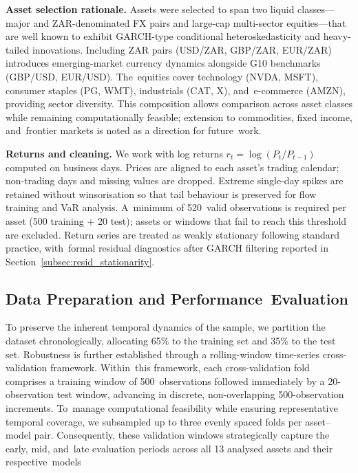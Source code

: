 \documentclass[risks,article,accept,pdftex,moreauthors]{Definitions/mdpi}
\begin{document}
\textbf{Asset selection rationale.} Assets were selected to span two liquid classes—major and ZAR-denominated FX pairs and large-cap multi-sector equities—that are well known to exhibit GARCH-type conditional heteroskedasticity and heavy-tailed innovations. Including ZAR pairs (USD/ZAR, GBP/ZAR, EUR/ZAR) introduces emerging-market currency dynamics alongside G10 benchmarks (GBP/USD, EUR/USD). The~equities cover technology (NVDA, MSFT), consumer staples (PG, WMT), industrials (CAT, X), and~e-commerce (AMZN), providing sector diversity. This composition allows comparison across asset classes while remaining computationally feasible; extension to commodities, fixed income, and~frontier markets is noted as a direction for future~work.

\textbf{Returns and cleaning.} We work with log returns $r_t = \log(P_t / P_{t-1})$ computed on business days. Prices are aligned to each asset's trading calendar; non-trading days and missing values are dropped. Extreme single-day spikes are retained without winsorisation so that tail behaviour is preserved for flow training and VaR analysis. A~minimum of 520~valid observations is required per asset (500 training + 20 test); assets or windows that fail to reach this threshold are excluded. Return series are treated as weakly stationary following standard practice, with~formal residual diagnostics after GARCH filtering reported in Section~\ref{subsec:resid_stationarity}.

\subsection{Data Preparation and Performance~Evaluation} 

To preserve the inherent temporal dynamics of the sample, we partition the dataset chronologically, allocating 65\% to the training set and 35\% to the test set. Robustness is further established through a rolling-window time-series cross-validation framework. Within~this framework, each cross-validation fold comprises a training window of \mbox{500~observations} followed immediately by a 20-observation test window, advancing in discrete, non-overlapping 500-observation increments. To~manage computational feasibility while ensuring representative temporal coverage, we subsampled up to three evenly spaced folds per asset–model pair. Consequently, these validation windows strategically capture the early, mid, and~late evaluation periods across all 13 analysed assets and their respective~models
\end{document}
